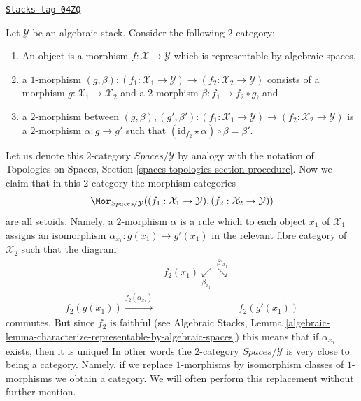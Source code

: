 \begin{remark}
\label{stacks-properties-remark-representable-over}
\href{https://stacks.math.columbia.edu/tag/04ZQ}{\texttt{Stacks tag 04ZQ}}

Let $\mathcal{Y}$ be an algebraic stack. Consider the following
$2$-category:
\begin{enumerate}
\item An object is a morphism $f : \mathcal{X} \to \mathcal{Y}$
which is representable by algebraic spaces,
\item a $1$-morphism
$(g, \beta) :
(f_1 : \mathcal{X}_1 \to \mathcal{Y})
\to
(f_2 : \mathcal{X}_2 \to \mathcal{Y})$
consists of a morphism $g : \mathcal{X}_1 \to \mathcal{X}_2$ and a
$2$-morphism $\beta : f_1 \to f_2 \circ g$, and
\item a $2$-morphism between
$(g, \beta), (g', \beta') :
(f_1 : \mathcal{X}_1 \to \mathcal{Y})
\to
(f_2 : \mathcal{X}_2 \to \mathcal{Y})$
is a $2$-morphism $\alpha : g \to g'$ such that
$(\text{id}_{f_2} \star \alpha) \circ \beta = \beta'$.
\end{enumerate}
Let us denote this $2$-category $\textit{Spaces}/\mathcal{Y}$ by
analogy with the notation of
Topologies on Spaces, Section \ref{spaces-topologies-section-procedure}.
Now we claim that in this $2$-category the morphism categories
$$
\Mor_{\textit{Spaces}/\mathcal{Y}}(
(f_1 : \mathcal{X}_1 \to \mathcal{Y}),
(f_2 : \mathcal{X}_2 \to \mathcal{Y}))
$$
are all setoids. Namely, a $2$-morphism $\alpha$ is a rule which to each
object $x_1$ of $\mathcal{X}_1$ assigns an isomorphism
$\alpha_{x_1} : g(x_1) \longrightarrow g'(x_1)$
in the relevant fibre category of $\mathcal{X}_2$ such that the diagram
$$
\begin{array}{ccc} & f_2(x_1) \underset{\beta_{x_1}}{\swarrow}\overset{\beta'_{x_1}}{\searrow} &  \\ f_2(g(x_1)) \overset{f_2(\alpha_{x_1})}{\longrightarrow} &  & f_2(g'(x_1))\end{array}
$$
commutes. But since $f_2$ is faithful (see
Algebraic Stacks,
Lemma \ref{algebraic-lemma-characterize-representable-by-algebraic-spaces})
this means that if $\alpha_{x_1}$ exists, then it is unique! In other words the
$2$-category $\textit{Spaces}/\mathcal{Y}$ is very close to
being a category. Namely, if we replace $1$-morphisms by isomorphism
classes of $1$-morphisms we obtain a category. We will often
perform this replacement without further mention.
\end{remark}

